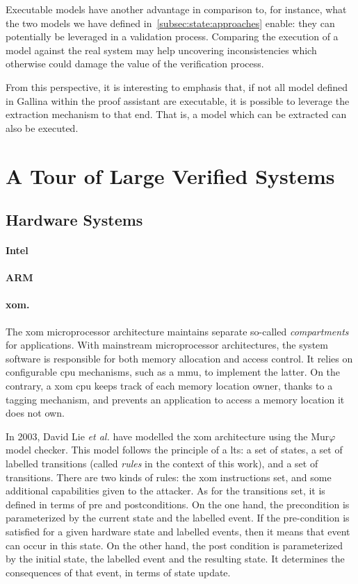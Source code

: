Executable models have another advantage in comparison to, for instance, what
the two models we have defined in~\ref{subsec:state:approaches} enable: they can
potentially be leveraged in a validation process.
%
Comparing the execution of a model against the real system may help uncovering
inconsistencies which otherwise could damage the value of the verification
process.

From this perspective, it is interesting to emphasis that, if not all model
defined in {\sc Gallina} within the  proof assistant are executable, it is
possible to leverage the extraction mechanism to that end.
%
That is, a model which can be extracted can also be executed.

\section{A Tour of Large Verified Systems}

\subsection{Hardware Systems}

\paragraph{Intel}
%

\paragraph{ARM}
%

\paragraph{\ac{xom}.}
%
The \ac{xom} microprocessor architecture maintains separate so-called
\emph{compartments} for applications.
%
With mainstream microprocessor architectures, the system software is responsible
for both memory allocation and access control.
%
It relies on configurable \ac{cpu} mechanisms, such as a \ac{mmu}, to implement
the latter.
%
On the contrary, a \ac{xom} \ac{cpu} keeps track of each memory location owner,
thanks to a tagging mechanism, and prevents an application to access a memory
location it does not own.

In 2003, David Lie \emph{et al.} have modelled the \ac{xom} architecture using
the Mur$\varphi$ model checker.
%
This model follows the principle of a \ac{lts}: a set of states, a set of
labelled transitions (called \emph{rules} in the context of this work), and a
set of transitions.
%
There are two kinds of rules: the \ac{xom} instructions set, and some additional
capabilities given to the attacker.
%
As for the transitions set, it is defined in terms of pre and postconditions.
%
On the one hand, the precondition is parameterized by the current state and the
labelled event.
%
If the pre-condition is satisfied for a given hardware state and labelled
events, then it means that event can occur in this state.
%
On the other hand, the post condition is parameterized by the initial state, the
labelled event and the resulting state.
%
It determines the consequences of that event, in terms of state update.

